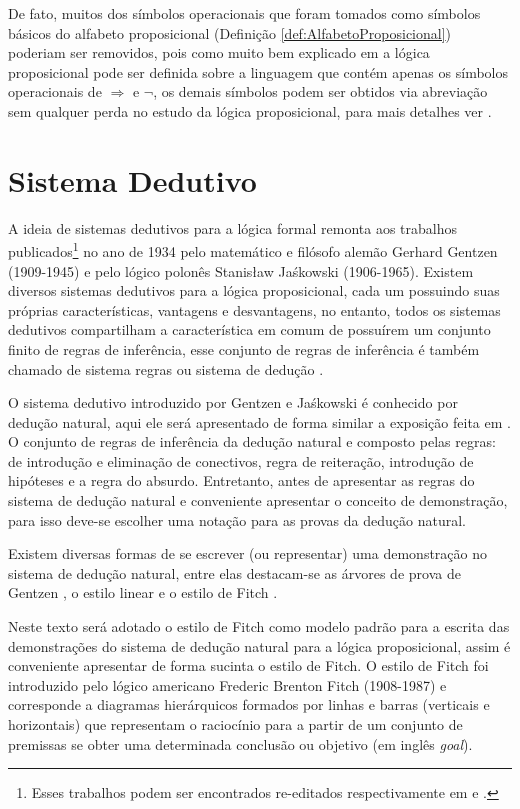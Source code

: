 De fato, muitos dos símbolos operacionais que foram tomados como símbolos básicos do alfabeto proposicional (Definição \ref{def:AlfabetoProposicional}) poderiam ser removidos, pois como muito bem explicado em \cite{benja-Logica, joaoPavao2014} a lógica proposicional pode ser definida sobre a linguagem que contém apenas os símbolos operacionais de $\Rightarrow$ e $\neg$, os demais símbolos podem ser obtidos via abreviação sem qualquer perda no estudo da lógica proposicional, para mais detalhes ver \cite{benja-Logica}.

\section{Sistema Dedutivo}\label{sec:SistemaDedutivo}

A ideia de sistemas dedutivos para a lógica formal remonta aos trabalhos publicados\footnote{Esses trabalhos podem ser encontrados re-editados respectivamente em \cite{gentzen1969} e \cite{jaskowski1934}.} no ano de 1934 pelo matemático e filósofo alemão Gerhard Gentzen (1909-1945) e pelo lógico polonês Stanisław Jaśkowski (1906-1965). Existem diversos sistemas dedutivos para a lógica proposicional, cada um possuindo suas próprias características, vantagens e desvantagens, no entanto, todos os sistemas dedutivos compartilham a característica em comum de possuírem um conjunto finito de regras de inferência, esse conjunto de regras de inferência é também chamado de sistema regras ou sistema de dedução \cite{edgar2002}.

O sistema dedutivo introduzido por Gentzen e Jaśkowski é conhecido por dedução natural, aqui ele será apresentado de forma similar a exposição feita em \cite{joaoPavao2014}. O conjunto de regras de inferência da dedução natural e composto pelas regras: de introdução e eliminação de conectivos, regra de reiteração, introdução de hipóteses e a regra do absurdo. Entretanto, antes de apresentar as regras do sistema de dedução natural e conveniente apresentar o conceito de demonstração, para isso deve-se escolher uma notação para as provas da dedução natural.

Existem diversas formas de se escrever (ou representar) uma demonstração no sistema de dedução natural, entre elas destacam-se as árvores de prova de Gentzen \cite{benja-Logica}, o estilo linear \cite{copi1981, mortari2001} e o estilo de Fitch \cite{fitch1953, joaoPavao2014}. 

Neste texto será adotado o estilo de Fitch como modelo padrão para a escrita das demonstrações do sistema de dedução natural para a lógica proposicional, assim é conveniente apresentar de forma sucinta o estilo de Fitch. O estilo de Fitch foi introduzido pelo lógico americano Frederic Brenton Fitch (1908-1987) e corresponde a diagramas hierárquicos formados por linhas e barras (verticais e horizontais) que representam o raciocínio para a partir de um conjunto de premissas se obter uma determinada conclusão ou objetivo (em inglês \textit{goal}).

